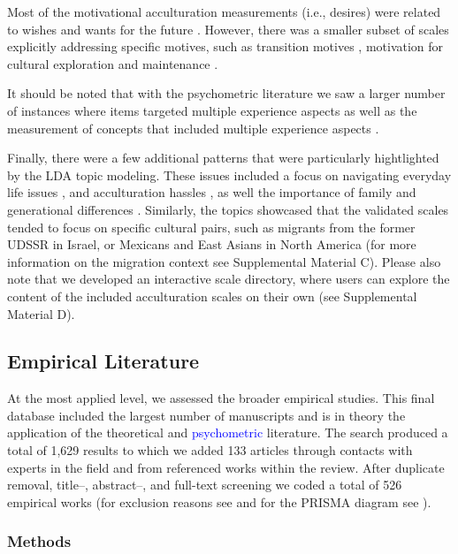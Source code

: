 Most of the motivational acculturation measurements (i.e., desires) were
related to wishes and wants for the future
\citep[e.g.,][]{Mancini2014, Ben-Shalom2003}. However, there was a
smaller subset of scales explicitly addressing specific motives, such as
transition motives \citep[][]{Mchitarjan2015}, motivation for cultural
exploration and maintenance \citep[][]{Recker2017}.

It should be noted that with the psychometric literature we saw a larger
number of instances where items targeted multiple experience aspects
\citep[e.g., enjoyment of wearing traditional clothing,][]{Ozer2016} as
well as the measurement of concepts that included multiple experience
aspects \citep[e.g., satisfaction,][]{Cuellar1995a}.

Finally, there were a few additional patterns that were particularly
hightlighted by the LDA topic modeling. These issues included a focus on
navigating everyday life issues \citep[e.g.,][]{Harder2018}, and
acculturation hassles \citep[e.g.,][]{Vinokurov2002}, as well the
importance of family and generational differences
\citep[e.g.,][]{ICSEYteam2006, Lee2004b}. Similarly, the topics
showcased that the validated scales tended to focus on specific cultural
pairs, such as migrants from the former UDSSR in Israel, or Mexicans and
East Asians in North America (for more information on the migration
context see Supplemental Material C). Please also note that we developed
an interactive scale directory, where users can explore the content of
the included acculturation scales on their own (see Supplemental
Material D). \color{black}

\subsection{Empirical Literature}

At the most applied level, we assessed the broader empirical studies.
This final database included the largest number of manuscripts and is in
theory the application of the theoretical and
\textcolor{blue}{psychometric} literature. The search produced a total
of 1,629 results to which we added 133 articles through contacts with
experts in the field and from referenced works within the review. After
duplicate removal, title--, abstract--, and full-text screening we coded
a total of 526 empirical works (for exclusion reasons see
 and for the PRISMA diagram see
).

\subsubsection{Methods}

